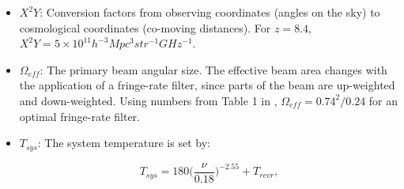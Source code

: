 \documentclass[preprint2,numberedappendix,tighten]{aastex6}  %
\begin{document}
\begin{itemize}
\item $X^{2}Y$: Conversion factors from observing coordinates (angles on the sky) to cosmological coordinates (co-moving distances). For $z=8.4$, $X^{2}Y = 5 \times 10^{11} h^{-3} Mpc^{3} str^{-1} GHz^{-1}$.
\item $\Omega_{eff}$: The primary beam angular size. The effective beam area changes with the application of a fringe-rate filter, since parts of the beam are up-weighted and down-weighted. Using numbers from Table 1 in \citet{parsons_et_al2016}, $\Omega_{eff} = 0.74^{2}/0.24$ for an optimal fringe-rate filter. 
\item $T_{sys}$: The system temperature is set by:

\begin{equation}
\label{eq:sys}
T_{sys} = 180\Big(\frac{\nu}{0.18}\Big)^{-2.55} + T_{rcvr},
\end{equation}


\end{itemize}
\end{document}
